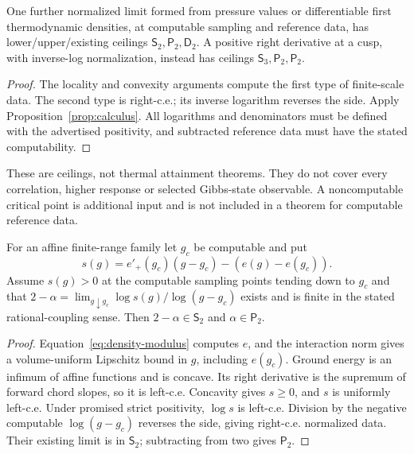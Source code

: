 \begin{corollary}
One further normalized limit formed from pressure values or
differentiable first thermodynamic densities, at computable
sampling and reference data, has lower/upper/existing ceilings
$\mathsf S_2,\mathsf P_2,\mathsf D_2$. A positive right derivative
at a cusp, with inverse-log normalization, instead has ceilings
$\mathsf S_3,\mathsf P_2,\mathsf P_2$.
\end{corollary}
\begin{proof}
The locality and convexity arguments compute the first type of
finite-scale data. The second type is right-c.e.; its inverse
logarithm reverses the side. Apply Proposition~\ref{prop:calculus}.
All logarithms and denominators must be defined with the advertised
positivity, and subtracted reference data must have the stated
computability.
\end{proof}

These are ceilings, not thermal attainment theorems. They do not
cover every correlation, higher response or selected Gibbs-state
observable. A noncomputable critical point is additional input and
is not included in a theorem for computable reference data.

\begin{proposition}
For an affine finite-range family let $g_c$ be computable and put
\[
 s(g)=e'_+(g_c)(g-g_c)-(e(g)-e(g_c)).
\]
Assume $s(g)>0$ at the computable sampling points tending down to
$g_c$ and that
$2-\alpha=\lim_{g\downarrow g_c}\log s(g)/\log(g-g_c)$ exists
and is finite in the stated rational-coupling sense. Then
$2-\alpha\in\mathsf S_2$ and $\alpha\in\mathsf P_2$.
\end{proposition}
\begin{proof}
Equation~\eqref{eq:density-modulus} computes $e$, and the interaction
norm gives a volume-uniform Lipschitz bound in $g$, including $e(g_c)$.
Ground energy is an infimum of affine functions and is concave.
Its right derivative is the supremum of forward chord slopes, so
it is left-c.e. Concavity gives $s\geq0$, and $s$ is uniformly
left-c.e. Under promised strict positivity, $\log s$ is left-c.e.
Division by the negative computable $\log(g-g_c)$ reverses the
side, giving right-c.e. normalized data. Their existing limit is
in $\mathsf S_2$; subtracting from two gives $\mathsf P_2$.
\end{proof}

